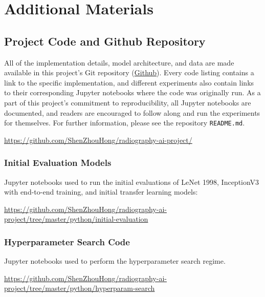 \setlength{\headwidth}{\textwidth}

\chapter{Additional Materials}

\section{Project Code and Github Repository}

All of the implementation details, model architecture, and data are made available in this project's Git repository (\href{https://github.com/ShenZhouHong/radiography-ai-project/}{Github}). Every code listing contains a link to the specific implementation, and different experiments also contain links to their corresponding Jupyter notebooks where the code was originally run. As a part of this project's commitment to reproducibility, all Jupyter notebooks are documented, and readers are encouraged to follow along and run the experiments for themselves. For further information, please see the repository \texttt{README.md}.

\url{https://github.com/ShenZhouHong/radiography-ai-project/}

\subsection{Initial Evaluation Models}

Jupyter notebooks used to run the initial evaluations of LeNet 1998, InceptionV3 with end-to-end training, and initial transfer learning models:

\url{https://github.com/ShenZhouHong/radiography-ai-project/tree/master/python/initial-evaluation}

\subsection{Hyperparameter Search Code}

Jupyter notebooks used to perform the hyperparameter search regime.

\url{https://github.com/ShenZhouHong/radiography-ai-project/tree/master/python/hyperparam-search}

